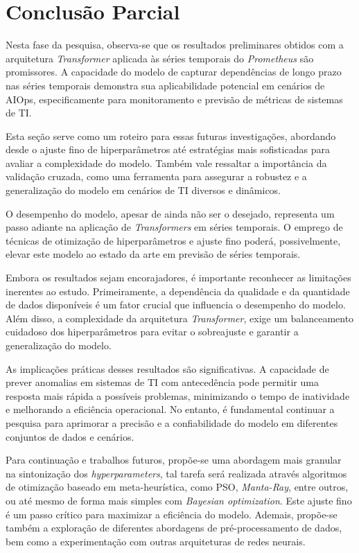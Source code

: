 \chapter{Conclusão Parcial} \label{Cap_conclusao}

Nesta fase da pesquisa, observa-se que os resultados preliminares obtidos com a arquitetura \textit{Transformer} aplicada às séries temporais do \textit{Prometheus} são promissores. A capacidade do modelo de capturar dependências de longo prazo nas séries temporais demonstra sua aplicabilidade potencial em cenários de AIOps, especificamente para monitoramento e previsão de métricas de sistemas de TI.

Esta seção serve como um roteiro para essas futuras investigações, abordando desde o ajuste fino de hiperparâmetros até estratégias mais sofisticadas para avaliar a complexidade do modelo. Também vale ressaltar a importância da validação cruzada, como uma ferramenta para assegurar a robustez e a generalização do modelo em cenários de TI diversos e dinâmicos. 

O desempenho do modelo, apesar de ainda não ser o desejado, representa um passo adiante na aplicação de \textit{Transformers} em séries temporais. O emprego de técnicas de otimização de hiperparâmetros e ajuste fino poderá, possivelmente, elevar este modelo ao estado da arte em previsão de séries temporais.

Embora os resultados sejam encorajadores, é importante reconhecer as limitações inerentes ao estudo. Primeiramente, a dependência da qualidade e da quantidade de dados disponíveis é um fator crucial que influencia o desempenho do modelo. Além disso, a complexidade da arquitetura \textit{Transformer}, exige um balanceamento cuidadoso dos hiperparâmetros para evitar o sobreajuste e garantir a generalização do modelo.

As implicações práticas desses resultados são significativas. A capacidade de prever anomalias em sistemas de TI com antecedência pode permitir uma resposta mais rápida a possíveis problemas, minimizando o tempo de inatividade e melhorando a eficiência operacional. No entanto, é fundamental continuar a pesquisa para aprimorar a precisão e a confiabilidade do modelo em diferentes conjuntos de dados e cenários.

Para continuação e trabalhos futuros, propõe-se uma abordagem mais granular na sintonização dos \textit{hyperparameters}, tal tarefa será realizada através algoritmos de otimização baseado em  meta-heurística, como PSO, \textit{Manta-Ray}, entre outros,  ou até mesmo de forma mais simples com \textit{Bayesian optimization}. Este ajuste fino é um passo crítico para maximizar a eficiência do modelo. Ademais, propõe-se também a exploração de diferentes abordagens de pré-processamento de dados, bem como a experimentação com outras arquiteturas de redes neurais.

